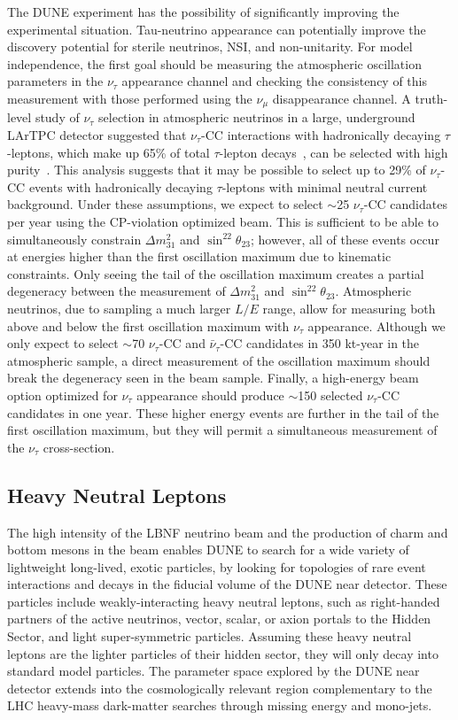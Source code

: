 The DUNE experiment has the possibility of significantly improving the experimental situation.  Tau-neutrino appearance can potentially improve the discovery potential for sterile neutrinos, NSI, and non-unitarity.  For model independence, the first goal should be measuring the atmospheric oscillation parameters in the $\nu_{\tau}$ appearance channel and checking the consistency of this measurement with those performed using the $\nu_{\mu}$ disappearance channel.  A truth-level study of $\nu_{\tau}$ selection in atmospheric neutrinos in a large, underground LArTPC detector suggested that $\nu_{\tau}$-CC interactions with hadronically decaying $\tau$-leptons, which make up 65\% of total $\tau$-lepton decays~\cite{PDG}, can be selected with high purity~\cite{Conrad:1008}.  This analysis suggests that it may be possible to select up to 29\% of $\nu_{\tau}$-CC events with hadronically decaying $\tau$-leptons with minimal neutral current background.  Under these assumptions, we expect to select $\sim$25 $\nu_{\tau}$-CC candidates per year using the CP-violation optimized beam.  This is sufficient to be able to simultaneously constrain $\Delta m^2_{31}$ and $\sin^22\theta_{23}$; however, all of these events occur at energies higher than the first oscillation maximum due to kinematic constraints.  Only seeing the tail of the oscillation maximum creates a partial degeneracy between the measurement of  $\Delta m^2_{31}$ and $\sin^22\theta_{23}$.  Atmospheric neutrinos, due to sampling a much larger $L/E$ range, allow for measuring both above and below the first oscillation maximum with $\nu_{\tau}$ appearance.  Although  we only expect to select $\sim$70 $\nu_{\tau}$-CC and $\bar{\nu}_{\tau}$-CC candidates in 350 kt-year in the atmospheric sample,  a direct measurement of the oscillation maximum should break the degeneracy seen in the beam sample.  Finally, a high-energy beam option optimized for $\nu_{\tau}$ appearance should produce $\sim$150 selected  $\nu_{\tau}$-CC candidates in one year.  These higher energy events are further in the tail of the first oscillation maximum, but they will permit a simultaneous measurement of the $\nu_{\tau}$ cross-section. 

\subsection{Heavy Neutral Leptons}
The high intensity of the LBNF neutrino beam and the production of charm and bottom mesons in the beam enables DUNE to search for a wide variety of lightweight long-lived, exotic particles, by looking for topologies of rare event interactions and decays in the fiducial volume of the DUNE near detector. These particles include weakly-interacting heavy neutral leptons, such as right-handed partners of the active neutrinos, vector, scalar, or axion portals to the Hidden Sector, and light super-symmetric particles. Assuming these heavy neutral leptons are the lighter particles of their hidden sector, they will only decay into standard model particles. The parameter space explored by the DUNE near detector extends into the cosmologically relevant region complementary to the LHC heavy-mass dark-matter searches through missing energy and mono-jets.

